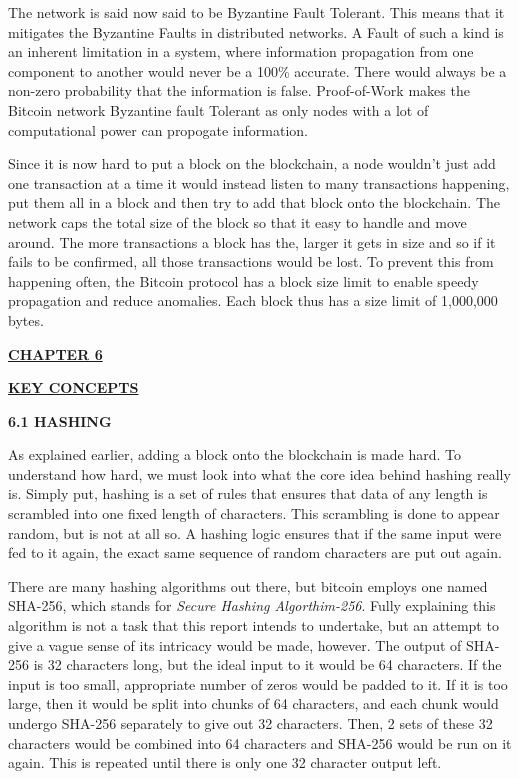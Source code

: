 \documentclass[12pt,a4paper]{report}
\begin{document}
\begin{flushleft}
The network is said now said to be Byzantine Fault Tolerant. This means that it mitigates the Byzantine Faults in distributed networks. A Fault of such a kind is an inherent limitation in a system, where information propagation from one component to another would never be a 100\% accurate. There would always be a non-zero probability that the information is false. Proof-of-Work makes the Bitcoin network Byzantine fault Tolerant as only nodes with a lot of computational power can propogate information.
\vspace{10mm}

Since it is now hard to put a block on the blockchain, a node wouldn't just add one transaction at a time it would instead listen to many transactions happening, put them all in a block and then try to add that block onto the blockchain. The network caps the total size of the block so that it easy to handle and move around.
\newline
The more transactions a block has the, larger it gets in size and so if it fails to be confirmed, all those transactions would be lost. To prevent this from happening often, the Bitcoin protocol has a block size limit to enable speedy propagation and reduce anomalies. Each block thus has a size limit of 1,000,000 bytes.

\newpage


\begin{center}\underline{ \Large \textbf{CHAPTER 6}}\end{center}
\begin{center}\underline{ \Large \textbf{KEY CONCEPTS}}\end{center}
\vspace{10mm}

\textbf{6.1 HASHING}


As explained earlier, adding a block onto the blockchain is made hard. To understand how hard, we must look into what the core idea behind hashing really is. Simply put, hashing is a set of rules that ensures that data of any length is scrambled into one fixed length of characters. This scrambling is done to appear random, but is not at all so. A hashing logic ensures that if the same input were fed to it again, the exact same sequence of random characters are put out again.
\vspace{10mm}

There are many hashing algorithms out there, but bitcoin employs one named SHA-256, which stands for \textit{Secure Hashing Algorthim-256}. Fully explaining this algorithm is not a task that this report intends to undertake, but an attempt to give a vague sense of its intricacy would be made, however.
\vspace{10mm}
The output of SHA-256 is 32 characters long, but the ideal input to it would be 64 characters. If the input is too small, appropriate number of zeros would be padded to it. If it is too large, then it would be split into chunks of 64 characters, and each chunk would undergo SHA-256 separately to give out 32 characters. Then, 2 sets of these 32 characters would be combined into 64 characters and SHA-256 would be run on it again. This is repeated until there is only one 32 character output left.


\end{flushleft}
\end{document}

